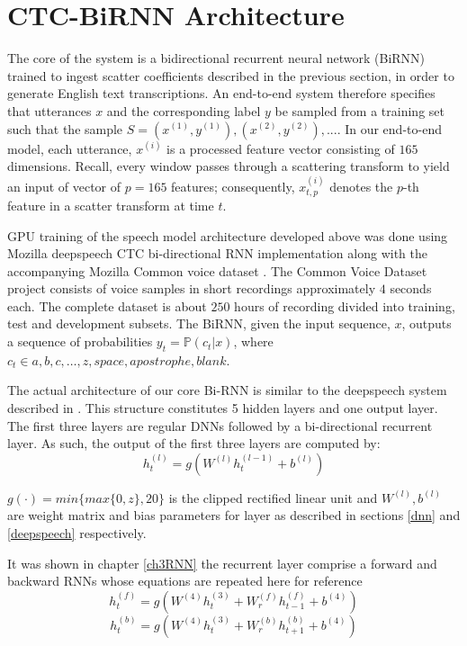 \section{CTC-BiRNN Architecture}
The core of the system is a bidirectional recurrent neural network (BiRNN) trained to ingest scatter coefficients described in the previous section, in order to generate English text transcriptions.  An end-to-end system therefore specifies that utterances $x$ and the corresponding label $y$ be sampled from a training set such that the sample $S = {(x^{(1)}, y^{(1)}), (x^{(2)}, y^{(2)}), . . .}$.   In our end-to-end model, each utterance, $x^{(i)}$ is a processed feature vector consisting of $165$ dimensions.  Recall, every window passes through a scattering transform to yield an input of vector of $p=165$ features; consequently,   $x^{(i)}_{t,p}$ denotes the $p$-th feature in a scatter transform at time $t$.  

GPU training of the speech model architecture developed above was done using Mozilla deepspeech \citep{mozilla/deepspeech_2019} CTC bi-directional RNN implementation along with the accompanying Mozilla Common voice dataset  \citep{mozilla_2019}.  The Common Voice Dataset project consists of voice samples in short recordings approximately $4$ seconds each.  The complete dataset is about $250$ hours of recording divided into training, test and development subsets.  The BiRNN, given the input sequence, $x$, outputs a sequence of probabilities $y_t=\mathbb{P}(c_t|x)$,  where $c_t \in a,b,c,\dots,z,space,apostrophe,blank$. 

The actual architecture of our core Bi-RNN is similar to the deepspeech system described in \cite{hannun2014deep}. This structure constitutes 5 hidden layers and one output layer.  The first three layers are regular DNNs followed by a bi-directional recurrent layer. As such, the output of the first three layers are computed by:
\begin{equation}
    h^{(l)}_t = g(W^{(l)} h^{(l−1)}_t + b^{(l)})\label{ch06_01_l1-3}
\end{equation}

$g(\cdot) = min\{max\{0,z\},20\}$  is the clipped rectified linear unit and $W^{(l)},b^{(l)}$ are weight matrix and bias parameters for layer  as described in sections \ref{dnn} and \ref{deepspeech} respectively.

It was shown in chapter \ref{ch3RNN} the recurrent layer comprise a forward and backward RNNs whose equations are repeated here for reference
\begin{equation}
    h^{(f)}_t = g(W^{(4)} h^{(3)}_t + W^{(f)}_r h^{(f)}_{t−1} + b^{(4)})
    \label{ch06_02_fwd}
\end{equation}
\begin{equation}
h^{(b)}_t = g(W^{(4)} h^{(3)}_t + W^{(b)}_r h^{(b)}_{t+1} + b^{(4)})    \label{ch06_03_bwd}
\end{equation}

